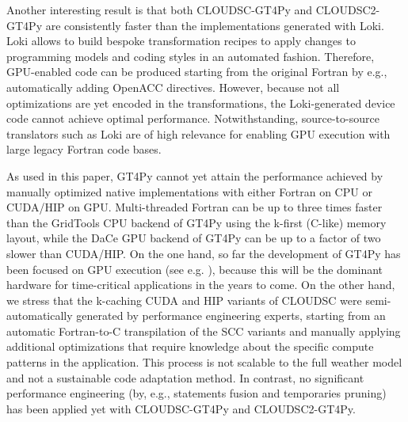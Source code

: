 \documentclass[gmd,manuscript,online]{copernicus}
\theoremstyle{theorem}
\theoremstyle{definition}
\theoremstyle{remark}
\theoremstyle{proposition}
\begin{document}
	Another interesting result is that both CLOUDSC-GT4Py and CLOUDSC2-GT4Py are consistently faster than the implementations generated with Loki. Loki allows to build bespoke transformation recipes to apply changes to programming models and coding styles in an automated fashion. Therefore, GPU-enabled code can be produced starting from the original Fortran by e.g., automatically adding OpenACC directives. However, because not all optimizations are yet encoded in the transformations, the Loki-generated device code cannot achieve optimal performance. Notwithstanding, source-to-source translators such as Loki are of high relevance for enabling GPU execution with large legacy Fortran code bases.

	As used in this paper, GT4Py cannot yet attain the performance achieved by manually optimized native implementations with either Fortran on CPU or CUDA/HIP on GPU. Multi-threaded Fortran can be up to three times faster than the GridTools CPU backend of GT4Py using the k-first (C-like) memory layout, while the DaCe GPU backend of GT4Py can be up to a factor of two slower than CUDA/HIP. On the one hand, so far the development of GT4Py has been focused on GPU execution (see e.g. \cite{dahm23}), because this will be the dominant hardware for time-critical applications in the years to come. On the other hand, we stress that the k-caching CUDA and HIP variants of CLOUDSC were semi-automatically generated by performance engineering experts, starting from an automatic Fortran-to-C transpilation of the SCC variants and manually applying additional optimizations that require knowledge about the specific compute patterns in the application. This process is not scalable to the full weather model and not a sustainable code adaptation method. In contrast, no significant performance engineering (by, e.g., statements fusion and temporaries pruning) has been applied yet with CLOUDSC-GT4Py and CLOUDSC2-GT4Py.
\end{document}
